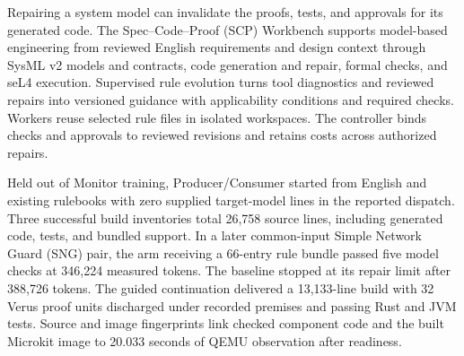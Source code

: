 Repairing a system model can invalidate the proofs, tests, and approvals for its generated code. The Spec--Code--Proof (SCP) Workbench supports model-based engineering from reviewed English requirements and design context through SysML v2 models and contracts, code generation and repair, formal checks, and seL4 execution. Supervised rule evolution turns tool diagnostics and reviewed repairs into versioned guidance with applicability conditions and required checks. Workers reuse selected rule files in isolated workspaces. The controller binds checks and approvals to reviewed revisions and retains costs across authorized repairs.

Held out of Monitor training, Producer/\allowbreak{}Consumer started from English and existing rulebooks with zero supplied target-model lines in the reported dispatch. Three successful build inventories total 26,758 source lines, including generated code, tests, and bundled support. In a later common-input Simple Network Guard (SNG) pair, the arm receiving a 66-entry rule bundle passed five model checks at 346,224 measured tokens. The baseline stopped at its repair limit after 388,726 tokens. The guided continuation delivered a 13,133-line build with 32 Verus proof units discharged under recorded premises and passing Rust and JVM tests. Source and image fingerprints link checked component code and the built Microkit image to 20.033 seconds of QEMU observation after readiness.
